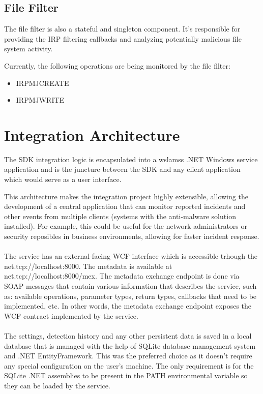         \subsection{File Filter}
        The file filter is also a stateful and singleton component. It's responsible for providing the IRP filtering callbacks and analyzing
        potentially malicious file system activity.

        Currently, the following operations are being monitored by the file filter:

        \begin{itemize}
            \item IRP\textunderscore MJ\textunderscore CREATE
            \item IRP\textunderscore MJ\textunderscore WRITE
        \end{itemize}

    \section{Integration Architecture}
    The SDK integration logic is encapsulated into a wslamss .NET Windows service application and is the juncture between the SDK and any 
    client application which would serve as a user interface.

    This architecture makes the integration project highly extensible, allowing the development of a central application that can monitor
    reported incidents and other events from multiple clients (systems with the anti-malware solution installed). For example, this could be
    useful for the network administrators or security reposibles in business environments, allowing for faster incident response.
    
    \paragraph{}
    The service has an external-facing WCF interface which is accessible trhough the net.tcp://localhost:8000. The metadata is available at
    net.tcp://localhost:8000/mex. The metadata exchange endpoint is done via SOAP messages that contain various information that describes
    the service, such as: available operations, parameter types, return types, callbacks that need to be implemented, etc. In other words,
    the metadata exchange endpoint exposes the WCF contract implemented by the service.

    \paragraph{}
    The settings, detection history and any other persistent data is saved in a local database that is managed with the help of SQLite
    database management system and .NET EntityFramework. This was the preferred choice as it doesn't require any special configuration on
    the user's machine. The only requirement is for the SQLite .NET assemblies to be present in the PATH environmental variable so they can
    be loaded by the service.

